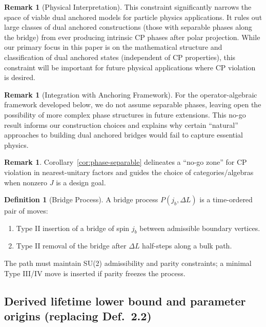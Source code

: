 \documentclass[11pt]{article}
\theoremstyle{plain}
\theoremstyle{definition}
\newtheorem{definition}[theorem]{Definition}
\newtheorem{remark}[theorem]{Remark}
\begin{document}
\begin{remark}[Physical Interpretation]
  This constraint significantly narrows the space of viable dual anchored models for particle physics applications. It rules out large classes of dual anchored constructions (those with separable phases along the bridge) from ever producing intrinsic CP phases after polar projection. While our primary focus in this paper is on the mathematical structure and classification of dual anchored states (independent of CP properties), this constraint will be important for future physical applications where CP violation is desired.
\end{remark}

\begin{remark}[Integration with Anchoring Framework]
  For the operator-algebraic framework developed below, we do not assume separable phases, leaving open the possibility of more complex phase structures in future extensions. This no-go result informs our construction choices and explains why certain ``natural'' approaches to building dual anchored bridges would fail to capture essential physics.
\end{remark}

\begin{remark}
  Corollary~\ref{cor:phase-separable} delineates a ``no-go zone'' for CP violation in nearest-unitary factors and guides the choice of categories/algebras when nonzero $J$ is a design goal.
\end{remark}

\begin{definition}[Bridge Process]
  A bridge process $P(j_b, \Delta L)$ is a time-ordered pair of moves:
  \begin{enumerate}
    \item Type II insertion of a bridge of spin $j_b$ between admissible boundary vertices.
    \item Type II removal of the bridge after $\Delta L$ half-steps along a bulk path.
  \end{enumerate}
  The path must maintain SU(2) admissibility and parity constraints; a minimal Type III/IV move is inserted if parity freezes the process.
\end{definition}

\subsection*{Derived lifetime lower bound and parameter origins (replacing Def.~2.2)}
\end{document}
